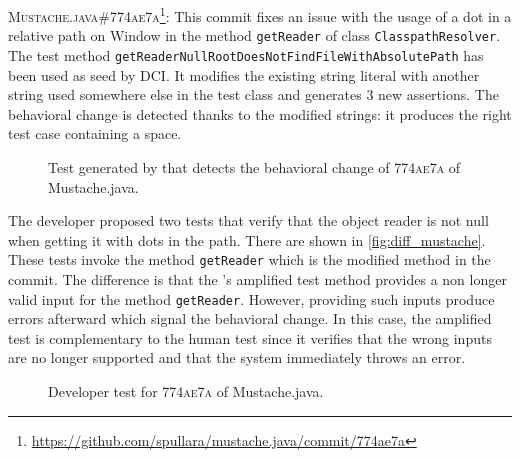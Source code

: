\textsc{Mustache.java\#774ae7a}\footnote{\url{https://github.com/spullara/mustache.java/commit/774ae7a}}: This commit fixes an issue with the usage of a dot in a  relative path on Window in the method \texttt{getReader} of class \texttt{ClasspathResolver}.
The test method \texttt{getReaderNullRootDoesNotFindFileWithAbsolutePath} has been used as seed by DCI. It modifies the existing string literal with another string used somewhere else in the test class and generates 3 new assertions.
The behavioral change is detected thanks to the modified strings: it produces the right test case containing a space.

\begin{figure}[h]
\centering
{}
\caption{Test generated by \DCII that detects the behavioral change of \textsc{774ae7a} of Mustache.java.}
\label{fig:ampl_mustache}
\end{figure}

The developer proposed two tests that verify that the object reader is not null when getting it with dots in the path.
There are shown in \autoref{fig:diff_mustache}.
These tests invoke the method \texttt{getReader} which is the modified method in the commit.
%
The difference is that the \DCII's amplified test method provides a non longer valid input for the method \texttt{getReader}.
However, providing such inputs produce errors afterward which signal the behavioral change.
In this case, the amplified test is complementary to the human test since it verifies that the wrong inputs are no longer supported and that the system immediately throws an error.

\begin{figure}[h]
\centering
{}
\caption{Developer test for \textsc{774ae7a} of Mustache.java.}
\label{fig:diff_mustache}
\end{figure}

